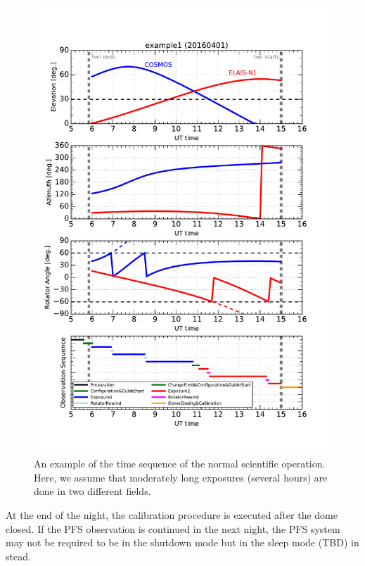 \documentclass[a4paper]{article}
\begin{document}
\begin{figure}[!htb]
\begin{center}
\includegraphics[scale=0.8]{./figures/example_operation_over_night.pdf}
\end{center}
\caption{An example of the time sequence of the normal scientific operation. Here, we assume that moderately long exposures (several hours) are done in two different fields. \label{fig:operation_sequence_overall2}}
\end{figure}

At the end of the night, the calibration procedure is executed after the dome closed. If the PFS observation is continued in the next night, the PFS system may not be required to be in the shutdown mode but in the sleep mode (TBD) in stead.
\end{document}
